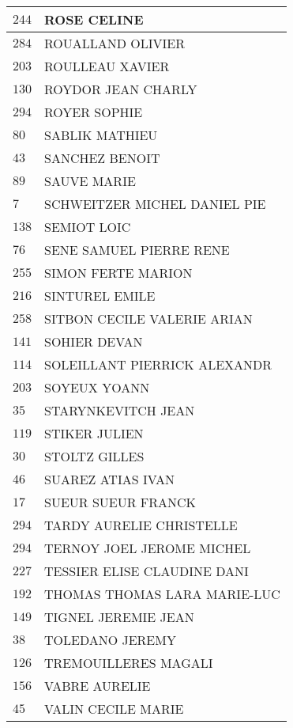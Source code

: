 \begin{xltabular}{\linewidth}{|l|X|}
    \hline
    $244$ & ROSE CELINE \\
    \hline
    $284$ & ROUALLAND OLIVIER \\
    \hline
    $203$ & ROULLEAU XAVIER \\
    \hline
    $130$ & ROYDOR JEAN CHARLY \\
    \hline
    $294$ & ROYER SOPHIE \\
    \hline
    $80$ & SABLIK MATHIEU \\
    \hline
    $43$ & SANCHEZ BENOIT \\
    \hline
    $89$ & SAUVE MARIE \\
    \hline
    $7$ & SCHWEITZER MICHEL DANIEL PIE \\
    \hline
    $138$ & SEMIOT LOIC \\
    \hline
    $76$ & SENE SAMUEL PIERRE RENE \\
    \hline
    $255$ & SIMON FERTE MARION \\
    \hline
    $216$ & SINTUREL EMILE \\
    \hline
    $258$ & SITBON CECILE VALERIE ARIAN \\
    \hline
    $141$ & SOHIER DEVAN \\
    \hline
    $114$ & SOLEILLANT PIERRICK ALEXANDR \\
    \hline
    $203$ & SOYEUX YOANN \\
    \hline
    $35$ & STARYNKEVITCH JEAN \\
    \hline
    $119$ & STIKER JULIEN \\
    \hline
    $30$ & STOLTZ GILLES \\
    \hline
    $46$ & SUAREZ ATIAS IVAN \\
    \hline
    $17$ & SUEUR SUEUR FRANCK \\
    \hline
    $294$ & TARDY AURELIE CHRISTELLE \\
    \hline
    $294$ & TERNOY JOEL JEROME MICHEL \\
    \hline
    $227$ & TESSIER ELISE CLAUDINE DANI \\
    \hline
    $192$ & THOMAS THOMAS LARA MARIE-LUC \\
    \hline
    $149$ & TIGNEL JEREMIE JEAN \\
    \hline
    $38$ & TOLEDANO JEREMY \\
    \hline
    $126$ & TREMOUILLERES MAGALI \\
    \hline
    $156$ & VABRE AURELIE \\
    \hline
    $45$ & VALIN CECILE MARIE \\

\end{xltabular}

